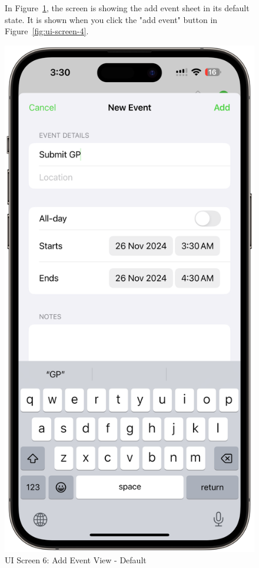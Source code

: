 \begin{figure}[!h]
    \begin{minipage}{0.65\textwidth}
        In Figure~\ref{fig:ui-screen-6}, the screen is showing the add event sheet in its default state. It is shown when you click the "add event" button in Figure~\ref{fig:ui-screen-4}.
    \end{minipage}
    \hfill
    \begin{minipage}{0.3\textwidth}
        \centering
        \includegraphics[width=\textwidth]{images/screen6.png}
        \caption{UI Screen 6: Add Event View - Default}
        \label{fig:ui-screen-6}
    \end{minipage}
\end{figure}

